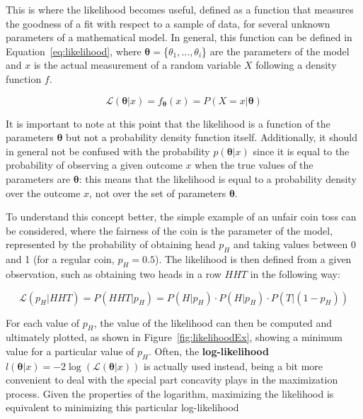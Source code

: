 \documentclass[a4paper, 11pt]{report}
\begin{document}
This is where the likelihood becomes useful, defined as a function that measures the goodness of a fit with respect to a sample of data, for several unknown parameters of a mathematical model. In general, this function can be defined in Equation~\ref{eq:likelihood}, where $\bm \theta = $\{$\theta_1, ..., \theta_i$\} are the parameters of the model and $x$ is the actual measurement of a random variable $X$ following a density function $f$.

\begin{equation}
\label{eq:likelihood}
\mathcal{L}(\bm \theta | x) = f_{\bm \theta}(x) = P(X = x | \bm \theta)
\end{equation}

It is important to note at this point that the likelihood is a function of the parameters $\bm \theta$ but not a probability density function itself. Additionally, it should in general not be confused with the probability $p(\bm \theta | x)$ since it is equal to the probability of observing a given outcome $x$ when the true values of the parameters are $\bm \theta$: this means that the likelihood is equal to a probability density over the outcome $x$, not over the set of parameters $\bm \theta$.

To understand this concept better, the simple example of an unfair coin toss can be considered, where the fairness of the coin is the parameter of the model, represented by the probability of obtaining head $p_H$ and taking values between 0 and 1 (for a regular coin, $p_H = 0.5$). The likelihood is then defined from a given observation, such as obtaining two heads in a row $HHT$ in the following way:

\begin{equation}
\label{eq:likelihoodEx}
\mathcal{L}(p_H | HHT) = P(HHT | p_H) = P(H | p_H) \cdot P(H | p_H) \cdot P(T | (1-p_H))
\end{equation}

For each value of $p_H$, the value of the likelihood can then be computed and ultimately plotted, as shown in Figure~\ref{fig:likelihoodEx}, showing a minimum value for a particular value of $p_H$. Often, the \textbf{log-likelihood} $l(\bm \theta | x) = -2 \log(\mathcal{L}(\bm \theta | x))$ is actually used instead, being a bit more convenient to deal with the special part concavity plays in the maximization process. Given the properties of the logarithm, maximizing the likelihood is equivalent to minimizing this particular log-likelihood
\end{document}

